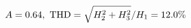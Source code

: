 \documentclass[preview]{standalone}
\begin{document}
\begin{align*}
\special{dvisvgm:raw <g id='unique000'>}A=0.64,\ \text{THD}=\sqrt{H_2^2+H_3^2}/H_1=12.0\%\special{dvisvgm:raw </g>}
\end{align*}
\end{document}
